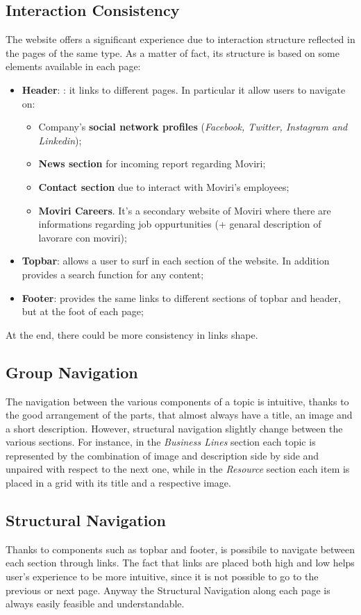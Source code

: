 \subsection{Interaction Consistency}
The website offers a significant experience due to interaction structure reflected in the pages of the same type. As a matter of fact, its structure is based on some elements available in each page: 
\begin{itemize}
\item \textbf{Header}: : it links to different pages. In particular it allow users to navigate on:
\begin{itemize}
\item Company's \textbf{social network profiles} (\textit{Facebook, Twitter, Instagram and Linkedin});
\item \textbf{News section} for incoming report regarding Moviri;
\item \textbf{Contact section} due to interact with Moviri's employees;
\item \textbf{Moviri Careers}. It's a secondary website of Moviri where there are informations regarding job oppurtunities (+ genaral description of lavorare con moviri);
\end{itemize}
\item \textbf{Topbar}: allows a user to surf in each section of the website. In addition provides a search function for any content; 
\item \textbf{Footer}: provides the same links to different sections of topbar and header, but at the foot of each page;
\end{itemize}
At the end, there could be more consistency in links shape.	
\subsection{Group Navigation}
The navigation between the various components of a topic is intuitive, thanks to the good arrangement of the parts, that almost always have a title, an image and a short description. However, structural navigation slightly change between the various sections. For instance, in the \textit{Business Lines} section each topic is represented by the combination of image and description side by side and unpaired with respect to the next one, while in the \textit{Resource} section each item is placed in a grid with its title and a respective image.
\subsection{Structural Navigation}
Thanks to components such as topbar and footer, is possibile to navigate between each section through links. The fact that links are placed both high and low helps user’s experience to be more intuitive, since it is not possible to go to the previous or next page. Anyway the Structural Navigation along each page is always easily feasible and understandable. 

